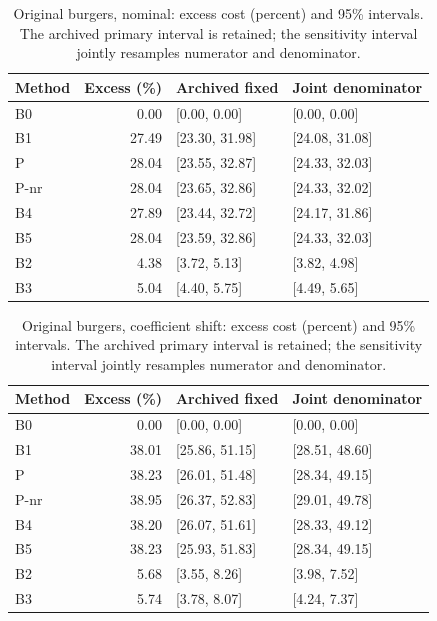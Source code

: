 \begin{table}[ht]
\caption{Original burgers, nominal: excess cost (percent) and 95\% intervals. The archived primary interval is retained; the sensitivity interval jointly resamples numerator and denominator.}\label{tab:joint_burgers_locked_nominal}
\centering\small
\begin{tabular}{@{}lrll@{}}\toprule
Method & Excess (\%) & Archived fixed & Joint denominator\\\midrule
B0 & 0.00 & [0.00, 0.00] & [0.00, 0.00] \\
B1 & 27.49 & [23.30, 31.98] & [24.08, 31.08] \\
P & 28.04 & [23.55, 32.87] & [24.33, 32.03] \\
P-nr & 28.04 & [23.65, 32.86] & [24.33, 32.02] \\
B4 & 27.89 & [23.44, 32.72] & [24.17, 31.86] \\
B5 & 28.04 & [23.59, 32.86] & [24.33, 32.03] \\
B2 & 4.38 & [3.72, 5.13] & [3.82, 4.98] \\
B3 & 5.04 & [4.40, 5.75] & [4.49, 5.65] \\
\bottomrule\end{tabular}
\end{table}
\begin{table}[ht]
\caption{Original burgers, coefficient shift: excess cost (percent) and 95\% intervals. The archived primary interval is retained; the sensitivity interval jointly resamples numerator and denominator.}\label{tab:joint_burgers_locked_coefficient_ood}
\centering\small
\begin{tabular}{@{}lrll@{}}\toprule
Method & Excess (\%) & Archived fixed & Joint denominator\\\midrule
B0 & 0.00 & [0.00, 0.00] & [0.00, 0.00] \\
B1 & 38.01 & [25.86, 51.15] & [28.51, 48.60] \\
P & 38.23 & [26.01, 51.48] & [28.34, 49.15] \\
P-nr & 38.95 & [26.37, 52.83] & [29.01, 49.78] \\
B4 & 38.20 & [26.07, 51.61] & [28.33, 49.12] \\
B5 & 38.23 & [25.93, 51.83] & [28.34, 49.15] \\
B2 & 5.68 & [3.55, 8.26] & [3.98, 7.52] \\
B3 & 5.74 & [3.78, 8.07] & [4.24, 7.37] \\
\bottomrule\end{tabular}
\end{table}
